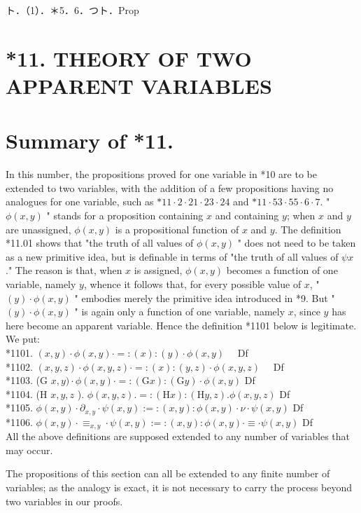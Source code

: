 \documentclass[10pt]{article}
\begin{document}
ト．（1）．＊5．6．つト．Prop

\section*{*11. THEORY OF TWO APPARENT VARIABLES}
\section*{Summary of *11.}
In this number, the propositions proved for one variable in *10 are to be extended to two variables, with the addition of a few propositions having no analogues for one variable, such as $* 11 \cdot 2 \cdot 21 \cdot 23 \cdot 24$ and $* 11 \cdot 53 \cdot 55 \cdot 6 \cdot 7$. " $\phi(x, y)$ " stands for a proposition containing $x$ and containing $y$; when $x$ and $y$ are unassigned, $\phi(x, y)$ is a propositional function of $x$ and $y$. The definition *11.01 shows that "the truth of all values of $\phi(x, y)$ " does not need to be taken as a new primitive idea, but is definable in terms of "the truth of all values of $\psi x$." The reason is that, when $x$ is assigned, $\phi(x, y)$ becomes a function of one variable, namely $y$, whence it follows that, for every possible value of $x$, " $(y) \cdot \phi(x, y)$ " embodies merely the primitive idea introduced in *9. But " $(y) \cdot \phi(x, y)$ " is again only a function of one variable, namely $x$, since $y$ has here become an apparent variable. Hence the definition *1101 below is legitimate. We put:\\
*1101. $(x, y) \cdot \phi(x, y) \cdot=:(x):(y) \cdot \phi(x, y) \quad$ Df\\
*1102. $(x, y, z) \cdot \phi(x, y, z) \cdot=:(x):(y, z) \cdot \phi(x, y, z) \quad$ Df\\
*1103. (G $x, y) \cdot \phi(x, y) \cdot=:(\mathrm{G} x):(\mathrm{G} y) \cdot \phi(x, y)$ Df\\
*1104. (H $x, y, z$ ). $\phi(x, y, z) .=:(\mathrm{H} x):(\mathrm{H} y, z) . \phi(x, y, z)$ Df\\
*1105. $\phi(x, y) \cdot \partial_{x, y} \cdot \psi(x, y):=:(x, y): \phi(x, y) \cdot \nu \cdot \psi(x, y)$ Df\\
*1106. $\phi(x, y) \cdot \equiv_{x, y} \cdot \psi(x, y):=:(x, y): \phi(x, y) \cdot \equiv \cdot \psi(x, y)$ Df\\
All the above definitions are supposed extended to any number of variables that may occur.

The propositions of this section can all be extended to any finite number of variables; as the analogy is exact, it is not necessary to carry the process beyond two variables in our proofs.
\end{document}
